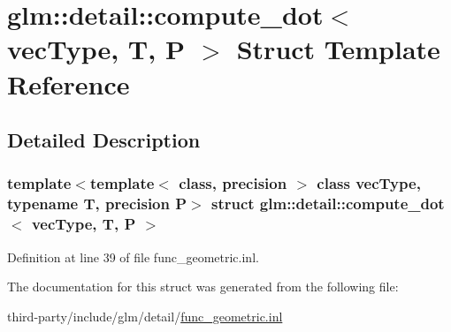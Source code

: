 \hypertarget{structglm_1_1detail_1_1compute__dot}{}\section{glm\+:\+:detail\+:\+:compute\+\_\+dot$<$ vec\+Type, T, P $>$ Struct Template Reference}
\label{structglm_1_1detail_1_1compute__dot}


\subsection{Detailed Description}
\subsubsection*{template$<$template$<$ class, precision $>$ class vec\+Type, typename T, precision P$>$\newline
struct glm\+::detail\+::compute\+\_\+dot$<$ vec\+Type, T, P $>$}



Definition at line 39 of file func\+\_\+geometric.\+inl.



The documentation for this struct was generated from the following file\+:\begin{DoxyCompactItemize}
\item 
third-\/party/include/glm/detail/\hyperlink{func__geometric_8inl}{func\+\_\+geometric.\+inl}\end{DoxyCompactItemize}
